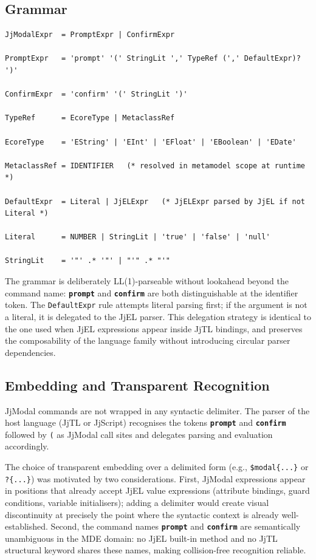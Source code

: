\documentclass[11pt,a4paper]{article}
\newcommand{\jjmodal}{\textsf{JjModal}}
\newcommand{\jjel}{\textsf{JjEL}}
\newcommand{\jjtl}{\textsf{JjTL}}
\newcommand{\kw}[1]{\texttt{\textbf{#1}}}
\begin{document}
\subsection{Grammar}
 
\begin{lstlisting}[style=grammar,caption={JjModal formal grammar in EBNF}]
JjModalExpr  = PromptExpr | ConfirmExpr
 
PromptExpr   = 'prompt' '(' StringLit ',' TypeRef (',' DefaultExpr)? ')'
 
ConfirmExpr  = 'confirm' '(' StringLit ')'
 
TypeRef      = EcoreType | MetaclassRef
 
EcoreType    = 'EString' | 'EInt' | 'EFloat' | 'EBoolean' | 'EDate'
 
MetaclassRef = IDENTIFIER   (* resolved in metamodel scope at runtime *)
 
DefaultExpr  = Literal | JjELExpr   (* JjELExpr parsed by JjEL if not Literal *)
 
Literal      = NUMBER | StringLit | 'true' | 'false' | 'null'
 
StringLit    = '"' .* '"' | "'" .* "'"
\end{lstlisting}
 
The grammar is deliberately LL(1)-parseable without lookahead beyond the
command name: \kw{prompt} and \kw{confirm} are both distinguishable at
the identifier token. The \texttt{DefaultExpr} rule attempts literal
parsing first; if the argument is not a literal, it is delegated to the
\jjel{} parser. This delegation strategy is identical to the one used
when \jjel{} expressions appear inside \jjtl{} bindings, and preserves
the composability of the language family without introducing circular
parser dependencies.
 
\subsection{Embedding and Transparent Recognition}\label{sec:jjmodal-embed}
 
\jjmodal{} commands are not wrapped in any syntactic delimiter. The
parser of the host language (\jjtl{} or \textsf{JjScript}) recognises the
tokens \kw{prompt} and \kw{confirm} followed by \texttt{(} as
\jjmodal{} call sites and delegates parsing and evaluation accordingly.
 
The choice of transparent embedding over a delimited form (e.g.,
\texttt{\$modal\{...\}} or \texttt{?\{...\}}) was motivated by two
considerations. First, \jjmodal{} expressions appear in positions that
already accept \jjel{} value expressions (attribute bindings, guard
conditions, variable initialisers); adding a delimiter would create
visual discontinuity at precisely the point where the syntactic context
is already well-established. Second, the command names \kw{prompt} and
\kw{confirm} are semantically unambiguous in the MDE domain: no
\jjel{} built-in method and no \jjtl{} structural keyword shares these
names, making collision-free recognition reliable.
 
\end{document}
